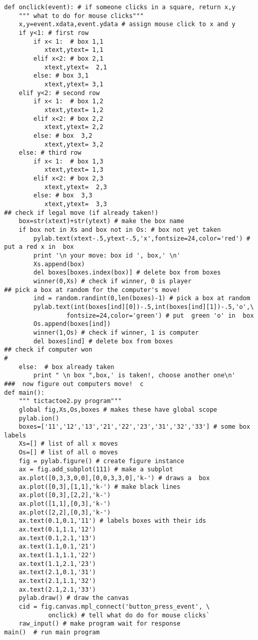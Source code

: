 {\begin{verbatim}
def onclick(event): # if someone clicks in a square, return x,y
    """ what to do for mouse clicks"""
    x,y=event.xdata,event.ydata # assign mouse click to x and y
    if y<1: # first row
        if x< 1:  # box 1,1
           xtext,ytext= 1,1
        elif x<2: # box 2,1
           xtext,ytext=  2,1
        else: # box 3,1
           xtext,ytext= 3,1
    elif y<2: # second row
        if x< 1:  # box 1,2
           xtext,ytext= 1,2
        elif x<2: # box 2,2
           xtext,ytext= 2,2
        else: # box  3,2
           xtext,ytext= 3,2
    else: # third row
        if x< 1:  # box 1,3
           xtext,ytext= 1,3
        elif x<2: # box 2,3
           xtext,ytext=  2,3
        else: # box  3,3
           xtext,ytext=  3,3
## check if legal move (if already taken!)
    box=str(xtext)+str(ytext) # make the box name
    if box not in Xs and box not in Os: # box not yet taken
        pylab.text(xtext-.5,ytext-.5,'x',fontsize=24,color='red') # put a red x in  box
        print '\n your move: box id ', box,' \n'
        Xs.append(box)
        del boxes[boxes.index(box)] # delete box from boxes
        winner(0,Xs) # check if winner, 0 is player
## pick a box at random for the computer's move!
        ind = random.randint(0,len(boxes)-1) # pick a box at random
        pylab.text(int(boxes[ind][0])-.5,int(boxes[ind][1])-.5,'o',\
                 fontsize=24,color='green') # put  green 'o' in  box
        Os.append(boxes[ind])
        winner(1,Os) # check if winner, 1 is computer
        del boxes[ind] # delete box from boxes
## check if computer won
# 
    else:  # box already taken
        print " \n box ",box,' is taken!, choose another one\n'
###  now figure out computers move!  c
def main():  
    """ tictactoe2.py program"""
    global fig,Xs,Os,boxes # makes these have global scope
    pylab.ion()
    boxes=['11','12','13','21','22','23','31','32','33'] # some box labels
    Xs=[] # list of all x moves
    Os=[] # list of all o moves
    fig = pylab.figure() # create figure instance
    ax = fig.add_subplot(111) # make a subplot
    ax.plot([0,3,3,0,0],[0,0,3,3,0],'k-') # draws a  box
    ax.plot([0,3],[1,1],'k-') # make black lines
    ax.plot([0,3],[2,2],'k-') 
    ax.plot([1,1],[0,3],'k-') 
    ax.plot([2,2],[0,3],'k-')
    ax.text(0.1,0.1,'11') # labels boxes with their ids
    ax.text(0.1,1.1,'12')
    ax.text(0.1,2.1,'13')
    ax.text(1.1,0.1,'21')
    ax.text(1.1,1.1,'22')
    ax.text(1.1,2.1,'23')
    ax.text(2.1,0.1,'31')
    ax.text(2.1,1.1,'32')
    ax.text(2.1,2.1,'33')
    pylab.draw() # draw the canvas
    cid = fig.canvas.mpl_connect('button_press_event', \
            onclick) # tell what do do for mouse clicks`
    raw_input() # make program wait for response
main()  # run main program
\end{verbatim}}



